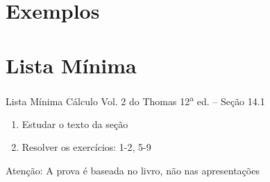 \documentclass[fleqn,utf8,aspectratio=169,12pt]{beamer}
\begin{document}
\section{Exemplos}





\section{Lista Mínima}

\begin{frame}{Lista Mínima}
  Cálculo Vol. 2 do Thomas 12\textsuperscript{a} ed. -- Seção 14.1
  \begin{enumerate}
    \item Estudar o texto da seção
    \item Resolver os exercícios: 1-2, 5-9
  \end{enumerate}

  \vfill
  Atenção: A prova é baseada no livro, não nas apresentações
\end{frame}

\end{document}
